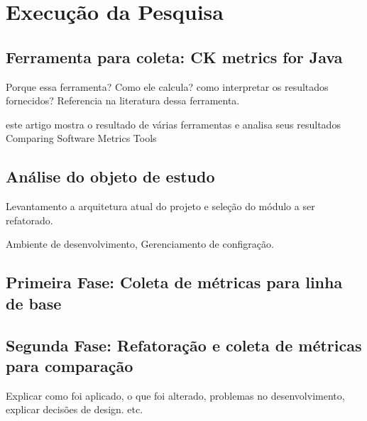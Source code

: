 \chapter{Execução da Pesquisa}

\section{Ferramenta para coleta: CK metrics for Java}

Porque essa ferramenta?
Como ele calcula? como interpretar os resultados fornecidos?
Referencia na literatura dessa ferramenta.

este artigo mostra o resultado de várias ferramentas e analisa seus resultados 
Comparing Software Metrics Tools

\section{Análise do objeto de estudo}

Levantamento a arquitetura atual do projeto e seleção do módulo a ser
refatorado.


Ambiente de desenvolvimento, Gerenciamento de configração.

\section{Primeira Fase: Coleta de métricas para linha de base}



\section{Segunda Fase: Refatoração e coleta de métricas para comparação}

Explicar como foi aplicado, o que foi alterado, problemas no desenvolvimento,
explicar decisões de design. etc.
